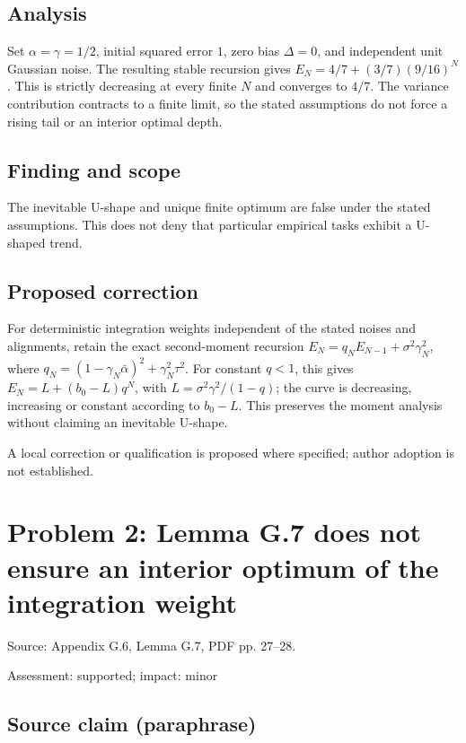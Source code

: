 \documentclass[11pt]{article}
\begin{document}
\subsection*{Analysis}

Set \(\alpha=\gamma=1/2\), initial squared error \(1\), zero bias \(\Delta=0\), and independent unit Gaussian noise. The resulting stable recursion gives \(E_N=4/7+(3/7)(9/16)^N\). This is strictly decreasing at every finite \(N\) and converges to \(4/7\). The variance contribution contracts to a finite limit, so the stated assumptions do not force a rising tail or an interior optimal depth.

\subsection*{Finding and scope}

The inevitable U-shape and unique finite optimum are false under the stated assumptions. This does not deny that particular empirical tasks exhibit a U-shaped trend.

\subsection*{Proposed correction}

For deterministic integration weights independent of the stated noises and alignments, retain the exact second-moment recursion \(E_N=q_NE_{N-1}+\sigma^2\gamma_N^2\), where \(q_N=(1-\gamma_N\bar\alpha)^2+\gamma_N^2\tau^2\). For constant \(q<1\), this gives \(E_N=L+(b_0-L)q^N\), with \(L=\sigma^2\gamma^2/(1-q)\); the curve is decreasing, increasing or constant according to \(b_0-L\). This preserves the moment analysis without claiming an inevitable U-shape.

A local correction or qualification is proposed where specified; author adoption is not established.

\section*{Problem 2: Lemma G.7 does not ensure an interior optimum of the integration weight}

Source: Appendix G.6, Lemma G.7, PDF pp. 27–28.

Assessment: supported; impact: minor

\subsection*{Source claim (paraphrase)}
\end{document}

